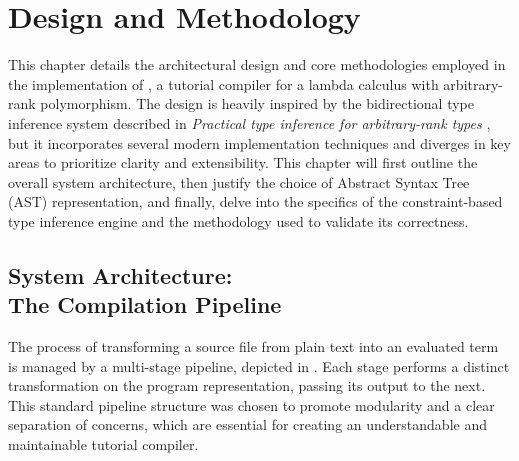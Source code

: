 \chapter{Design and Methodology}
\label{chap:DesignAndMethodology}

This chapter details the architectural design and core methodologies employed in the implementation of \Arralac, a tutorial compiler for a lambda calculus with arbitrary-rank polymorphism. The design is heavily inspired by the bidirectional type inference system described in \textit{Practical type inference for arbitrary-rank types} \cite{jones-practical-2007}, but it incorporates several modern implementation techniques and diverges in key areas to prioritize clarity and extensibility. This chapter will first outline the overall system architecture, then justify the choice of Abstract Syntax Tree (AST) representation, and finally, delve into the specifics of the constraint-based type inference engine and the methodology used to validate its correctness.

\section[System Architecture: The Compilation Pipeline]{System Architecture: \\ The Compilation Pipeline}
\label{sec:Design:Pipeline}

The process of transforming a source file from plain text into an evaluated term is managed by a multi-stage pipeline, depicted in . Each stage performs a distinct transformation on the program representation, passing its output to the next. This standard pipeline structure \cite{wits-type-inference-using-constraints} was chosen to promote modularity and a clear separation of concerns, which are essential for creating an understandable and maintainable tutorial compiler.

